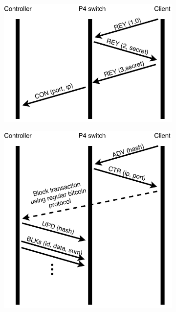 \begin{figure}[!bt]
\begin{center}
\begin{subfigure}[b]{0.32\textwidth}
	\includegraphics[width=\textwidth]{Figures/Handshake.pdf}
  \label{figure:handshake}
\end{subfigure}
\begin{subfigure}[b]{0.32\textwidth}
	\includegraphics[width=\textwidth]{Figures/UPD.pdf}

\end{subfigure}
\end{center}
\end{figure}
